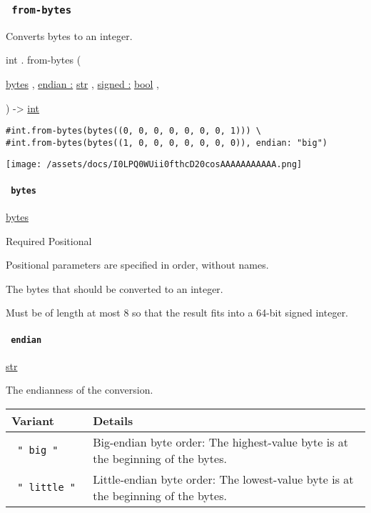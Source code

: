 \subsubsection{\texorpdfstring{\texttt{\ from-bytes\ }}{ from-bytes }}\label{definitions-from-bytes}

Converts bytes to an integer.

int { . } { from-bytes } (

{ \href{/docs/reference/foundations/bytes/}{bytes} , } {
\hyperref[definitions-from-bytes-parameters-endian]{endian :}
\href{/docs/reference/foundations/str/}{str} , } {
\hyperref[definitions-from-bytes-parameters-signed]{signed :}
\href{/docs/reference/foundations/bool/}{bool} , }

) -\textgreater{} \href{/docs/reference/foundations/int/}{int}

\begin{verbatim}
#int.from-bytes(bytes((0, 0, 0, 0, 0, 0, 0, 1))) \
#int.from-bytes(bytes((1, 0, 0, 0, 0, 0, 0, 0)), endian: "big")
\end{verbatim}

\texttt{[image: /assets/docs/I0LPQ0WUii0fthcD20cosAAAAAAAAAAA.png]}

\paragraph{\texorpdfstring{\texttt{\ bytes\ }}{ bytes }}\label{definitions-from-bytes-bytes}

\href{/docs/reference/foundations/bytes/}{bytes}

{Required} {{ Positional }}

\label{definitions-from-bytes-bytes-positional-tooltip}
Positional parameters are specified in order, without names.

The bytes that should be converted to an integer.

Must be of length at most 8 so that the result fits into a 64-bit signed
integer.

\paragraph{\texorpdfstring{\texttt{\ endian\ }}{ endian }}\label{definitions-from-bytes-endian}

\href{/docs/reference/foundations/str/}{str}

The endianness of the conversion.

\begin{longtable}[]{@{}ll@{}}
\toprule\noalign{}
Variant & Details \\
\midrule\noalign{}
\endhead
\bottomrule\noalign{}
\endlastfoot
\texttt{\ "\ big\ "\ } & Big-endian byte order: The highest-value byte
is at the beginning of the bytes. \\
\texttt{\ "\ little\ "\ } & Little-endian byte order: The lowest-value
byte is at the beginning of the bytes. \\
\end{longtable}

